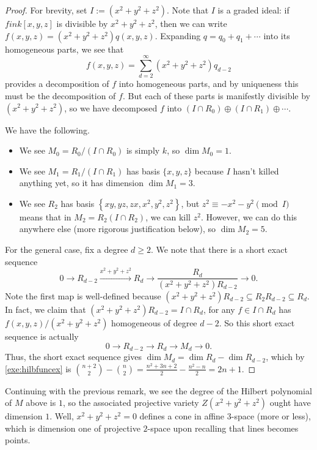 \begin{proof}
	For brevity, set $I:=\left(x^2+y^2+z^2\right)$. Note that $I$ is a graded ideal: if $fin k[x,y,z]$ is divisible by $x^2+y^2+z^2$, then we can write $f(x,y,z)=\left(x^2+y^2+z^2\right)q(x,y,z)$. Expanding $q=q_0+q_1+\cdots$ into its homogeneous parts, we see that
	\[f(x,y,z)=\sum_{d=2}^\infty\left(x^2+y^2+z^2\right)q_{d-2}\]
	provides a decomposition of $f$ into homogeneous parts, and by uniqueness this must be the decomposition of $f$. But each of these parts is manifestly divisible by $\left(x^2+y^2+z^2\right)$, so we have decomposed $f$ into $(I\cap R_0)\oplus(I\cap R_1)\oplus\cdots$.

	We have the following.
	\begin{itemize}
		\item We see $M_0=R_0/(I\cap R_0)$ is simply $k$, so $\dim M_0=1$.
		\item We see $M_1=R_1/(I\cap R_1)$ has basis $\{x,y,z\}$ because $I$ hasn't killed anything yet, so it has dimension $\dim M_1=3$.
		\item We see $R_2$ has basis $\left\{xy,yz,zx,x^2,y^2,z^2\right\}$, but $z^2\equiv-x^2-y^2\pmod I$ means that in $M_2=R_2(I\cap R_2)$, we can kill $z^2$. However, we can do this anywhere else (more rigorous justification below), so $\dim M_2=5$.
	\end{itemize}
	For the general case, fix a degree $d\ge2$. We note that there is a short exact sequence
	\[0\to R_{d-2}\stackrel{x^2+y^2+z^2}\to R_d\to\frac{R_d}{\left(x^2+y^2+z^2\right)R_{d-2}}\to0.\]
	Note the first map is well-defined because $\left(x^2+y^2+z^2\right)R_{d-2}\subseteq R_2R_{d-2}\subseteq R_d$. In fact, we claim that $\left(x^2+y^2+z^2\right)R_{d-2}=I\cap R_d$, for any $f\in I\cap R_d$ has $f(x,y,z)/\left(x^2+y^2+z^2\right)$ homogeneous of degree $d-2$. So this short exact sequence is actually
	\[0\to R_{d-2}\to R_d\to M_d\to 0.\]
	Thus, the short exact sequence gives $\dim M_d=\dim R_d-\dim R_{d-2}$, which by \autoref{exe:hilbfuncex} is $\binom{n+2}2-\binom n2=\frac{n^2+3n+2}2-\frac{n^2-n}2=2n+1$.
\end{proof}
\begin{remark}
	Continuing with the previous remark, we see the degree of the Hilbert polynomial of $M$ above is $1$, so the associated projective variety $Z\left(x^2+y^2+z^2\right)$ ought have dimension $1$. Well, $x^2+y^2+z^2=0$ defines a cone in affine $3$-space (more or less), which is dimension one of projective $2$-space upon recalling that lines becomes points.
\end{remark}
